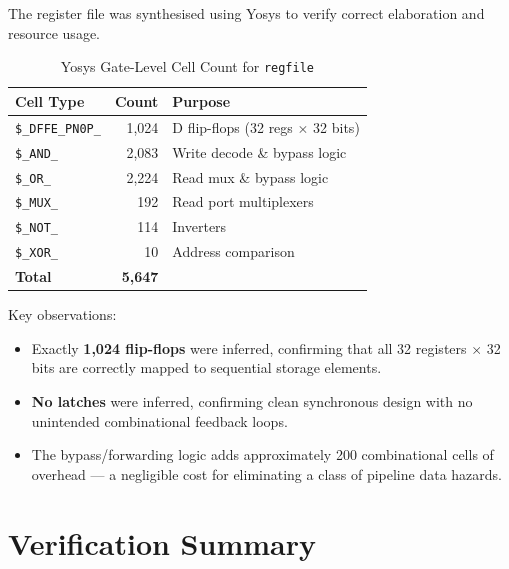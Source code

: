 \documentclass[12pt,a4paper]{article}
\begin{document}
The register file was synthesised using Yosys to verify correct elaboration and resource usage.

\begin{table}[H]
    \centering
    \begin{tabularx}{0.7\textwidth}{@{} l r X @{}}
        \toprule
        \textbf{Cell Type} & \textbf{Count} & \textbf{Purpose} \\
        \midrule
        \texttt{\$\_DFFE\_PN0P\_} & 1,024 & D flip-flops (32 regs $\times$ 32 bits) \\
        \texttt{\$\_AND\_}        & 2,083 & Write decode \& bypass logic \\
        \texttt{\$\_OR\_}         & 2,224 & Read mux \& bypass logic \\
        \texttt{\$\_MUX\_}        &   192 & Read port multiplexers \\
        \texttt{\$\_NOT\_}        &   114 & Inverters \\
        \texttt{\$\_XOR\_}        &    10 & Address comparison \\
        \midrule
        \textbf{Total}            & \textbf{5,647} & \\
        \bottomrule
    \end{tabularx}
    \caption{Yosys Gate-Level Cell Count for \texttt{regfile}}
\end{table}

Key observations:
\begin{itemize}
    \item Exactly \textbf{1,024 flip-flops} were inferred, confirming that all 32 registers $\times$ 32 bits are correctly mapped to sequential storage elements.
    \item \textbf{No latches} were inferred, confirming clean synchronous design with no unintended combinational feedback loops.
    \item The bypass/forwarding logic adds approximately 200 combinational cells of overhead — a negligible cost for eliminating a class of pipeline data hazards.
\end{itemize}

\section{Verification Summary}
\end{document}
